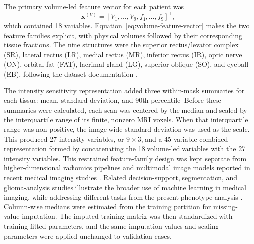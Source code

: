 \documentclass[utf8]{FrontiersinVancouver}
\begin{document}
The primary volume-led feature vector for each patient was
\begin{equation}
\boldsymbol{x}^{(V)}=\left[V_1,\ldots,V_9,f_1,\ldots,f_9\right]^{\mathsf{T}},
\label{eq:volume-feature-vector}
\end{equation}
which contained 18 variables. Equation~\ref{eq:volume-feature-vector} makes the two feature families explicit, with physical volumes followed by their corresponding tissue fractions. The nine structures were the superior rectus/levator complex (SR), lateral rectus (LR), medial rectus (MR), inferior rectus (IR), optic nerve (ON), orbital fat (FAT), lacrimal gland (LG), superior oblique (SO), and eyeball (EB), following the dataset documentation \citep{zhang2025tom500}.

The intensity sensitivity representation added three within-mask summaries for each tissue: mean, standard deviation, and 90th percentile. Before these summaries were calculated, each scan was centered by the median and scaled by the interquartile range of its finite, nonzero MRI voxels. When that interquartile range was non-positive, the image-wide standard deviation was used as the scale. This produced 27 intensity variables, or $9\times3$, and a 45-variable combined representation formed by concatenating the 18 volume-led variables with the 27 intensity variables. This restrained feature-family design was kept separate from higher-dimensional radiomics pipelines and multimodal image models reported in recent medical imaging studies \citep{wang2025bone,he2025histopath,li2023multimodal}. Related decision-support, segmentation, and glioma-analysis studies illustrate the broader use of machine learning in medical imaging, while addressing different tasks from the present phenotype analysis \citep{li2025edge,li2026kdlm,wu2025ffbformer}. Column-wise medians were estimated from the training partition for missing-value imputation. The imputed training matrix was then standardized with training-fitted parameters, and the same imputation values and scaling parameters were applied unchanged to validation cases.
\end{document}
